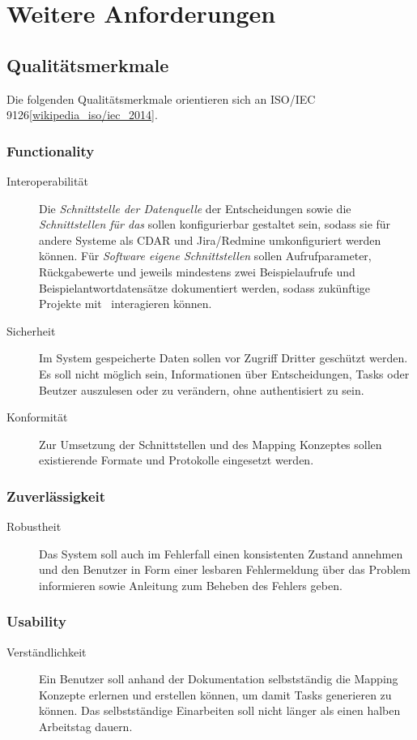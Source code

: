 \section{Weitere Anforderungen}

	\subsection{Qualitätsmerkmale}
		Die folgenden Qualitätsmerkmale orientieren sich an ISO/IEC 9126\ref{wikipedia_iso/iec_2014}.

		\subsubsection{Functionality}
		\begin{description}
			\item[Interoperabilität] Die \textit{Schnittstelle der Datenquelle} der Entscheidungen sowie die \textit{Schnittstellen für das \ppt} sollen konfigurierbar gestaltet sein, sodass sie für andere Systeme als CDAR und Jira/Redmine umkonfiguriert werden können. 
			Für \textit{Software eigene Schnittstellen} sollen Aufrufparameter, Rückgabewerte und jeweils mindestens zwei Beispielaufrufe und Beispielantwortdatensätze dokumentiert werden, sodass zukünftige Projekte mit \eeppi\ interagieren können.
			\item[Sicherheit] Im System gespeicherte Daten sollen vor Zugriff Dritter geschützt werden.
			Es soll nicht möglich sein, Informationen über Entscheidungen, Tasks oder Beutzer auszulesen oder zu verändern, 
			ohne authentisiert zu sein.
			\item[Konformität] Zur Umsetzung der Schnittstellen und des Mapping Konzeptes sollen existierende Formate und Protokolle eingesetzt werden.
		\end{description}
		
		
		\subsubsection{Zuverlässigkeit}
		\begin{description}
			\item[Robustheit] Das System soll auch im Fehlerfall einen konsistenten Zustand annehmen und den Benutzer in Form einer lesbaren Fehlermeldung über das Problem informieren sowie Anleitung zum Beheben des Fehlers geben.
		\end{description}
		

		\subsubsection{Usability}
		\begin{description}
			\item[Verständlichkeit] Ein Benutzer soll anhand der Dokumentation selbstständig die Mapping Konzepte erlernen und erstellen können, um damit Tasks generieren zu können. Das selbstständige Einarbeiten soll nicht länger als einen halben Arbeitstag dauern.
		\end{description}

